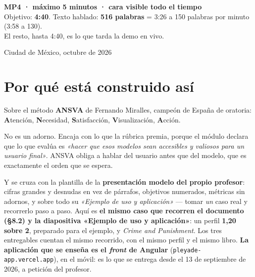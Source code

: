 \documentclass[11pt,a4paper]{article}
\begin{document}
\begin{titlepage}
\vfill

\begin{tcolorbox}[colback=llfondo, colframe=llazul!35, boxrule=0.8pt,
                  arc=3mm, width=13cm, halign=center]
  {\large\bfseries\color{llazul} MP4 · máximo 5 minutos · cara visible todo el tiempo}\\[4pt]
  {\small Objetivo: \textbf{4:40}. Texto hablado: \textbf{516 palabras} = 3:26 a 150 palabras por minuto (3:58 a 130).\\ El resto, hasta 4:40, es lo que tarda la demo en vivo.}
\end{tcolorbox}

\vspace{0.6cm}

{\normalsize Ciudad de México, octubre de 2026\par}

\end{titlepage}

\section{Por qué está construido así}

Sobre el método \textbf{ANSVA} de Fernando Miralles, campeón de España de
oratoria: \textbf{A}tención, \textbf{N}ecesidad, \textbf{S}atisfacción,
\textbf{V}isualización, \textbf{A}cción.

No es un adorno. Encaja con lo que la rúbrica premia, porque el módulo declara
que lo que evalúa es \emph{«hacer que esos modelos sean accesibles y valiosos
para un usuario final»}. ANSVA obliga a hablar del usuario antes que del
modelo, que es exactamente el orden que se espera.

Y se cruza con la plantilla de la \textbf{presentación modelo del propio
profesor}: cifras grandes y desnudas en vez de párrafos, objetivos numerados,
métricas sin adornos, y sobre todo su \emph{«Ejemplo de uso y aplicación»} ---
tomar \emph{un} caso real y recorrerlo paso a paso. Aquí es \textbf{el mismo
caso que recorren el documento (§8.2) y la diapositiva «Ejemplo de uso y
aplicación»}: un perfil \textbf{1,20 sobre 2}, preparado para el ejemplo, y \emph{Crime and
Punishment}. Los tres entregables cuentan el mismo recorrido, con el mismo perfil y el mismo libro. \textbf{La aplicación que se enseña es el \emph{front}
de Angular} (\texttt{pleyade-app.vercel.app}), en el
móvil: es lo que se entrega desde el 13 de septiembre de 2026, a petición del
profesor.
\end{document}
